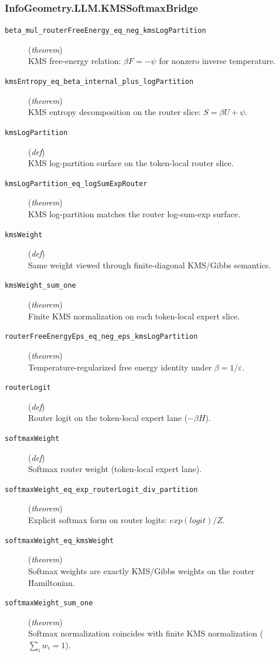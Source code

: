 \documentclass[11pt,a4paper]{article}
\begin{document}
\subsubsection*{InfoGeometry.LLM.KMSSoftmaxBridge}
\begin{description}
  \item[\texttt{beta\_mul\_routerFreeEnergy\_eq\_neg\_kmsLogPartition}] (\textit{theorem}) \\ KMS free-energy relation: $\beta  F = -\psi $ for nonzero inverse temperature.
  \item[\texttt{kmsEntropy\_eq\_beta\_internal\_plus\_logPartition}] (\textit{theorem}) \\ KMS entropy decomposition on the router slice: $S = \beta  U + \psi $.
  \item[\texttt{kmsLogPartition}] (\textit{def}) \\ KMS log-partition surface on the token-local router slice.
  \item[\texttt{kmsLogPartition\_eq\_logSumExpRouter}] (\textit{theorem}) \\ KMS log-partition matches the router log-sum-exp surface.
  \item[\texttt{kmsWeight}] (\textit{def}) \\ Same weight viewed through finite-diagonal KMS/Gibbs semantics.
  \item[\texttt{kmsWeight\_sum\_one}] (\textit{theorem}) \\ Finite KMS normalization on each token-local expert slice.
  \item[\texttt{routerFreeEnergyEps\_eq\_neg\_eps\_kmsLogPartition}] (\textit{theorem}) \\ Temperature-regularized free energy identity under $\beta  = 1/\varepsilon $.
  \item[\texttt{routerLogit}] (\textit{def}) \\ Router logit on the token-local expert lane ($-\beta  H$).
  \item[\texttt{softmaxWeight}] (\textit{def}) \\ Softmax router weight (token-local expert lane).
  \item[\texttt{softmaxWeight\_eq\_exp\_routerLogit\_div\_partition}] (\textit{theorem}) \\ Explicit softmax form on router logits: $exp(logit) / Z$.
  \item[\texttt{softmaxWeight\_eq\_kmsWeight}] (\textit{theorem}) \\ Softmax weights are exactly KMS/Gibbs weights on the router Hamiltonian.
  \item[\texttt{softmaxWeight\_sum\_one}] (\textit{theorem}) \\ Softmax normalization coincides with finite KMS normalization ($\sum _i  w_i  = 1$).
\end{description}
\end{document}
